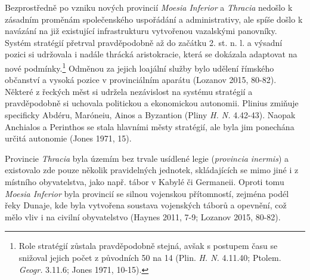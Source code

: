Bezprostředně po vzniku nových provincií {\em Moesia Inferior} a {\em Thracia} nedošlo k zásadním proměnám společenského uspořádání a administrativy, ale spíše došlo k navázání na již existující infrastrukturu vytvořenou vazalskými panovníky. Systém stratégií přetrval pravděpodobně až do začátku 2. st. n. l. a výsadní pozici si udržovala i nadále thrácká aristokracie, která se dokázala adaptovat na nové podmínky.\footnote{Role stratégií zůstala pravděpodobně stejná, avšak s postupem času se snižoval jejich počet z původních 50 na 14 (Plin. {\em H. N.} 4.11.40; Ptolem. {\em Geogr.} 3.11.6; Jones 1971, 10-15).} Odměnou za jejich loajální služby bylo udělení římského občanství a vysoká pozice v provinciálním aparátu (Lozanov 2015, 80-82). Některé z řeckých měst si udržela nezávislost na systému stratégií a pravděpodobně si uchovala politickou a ekonomickou autonomii. Plinius zmiňuje specificky Abdéru, Maróneiu, Ainos a Byzantion (Pliny {\em H. N.} 4.42-43). Naopak Anchialos a Perinthos se stala hlavními městy stratégií, ale byla jim ponechána určitá autonomie (Jones 1971, 15).

Provincie {\em Thracia} byla územím bez trvale usídlené legie ({\em provincia inermis}) a existovalo zde pouze několik pravidelných jednotek, skládajících se mimo jiné i z místního obyvatelstva, jako např. tábor v Kabylé či Germaneii. Oproti tomu {\em Moesia Inferior} byla provincií se silnou vojenskou přítomností, zejména podél řeky Dunaje, kde byla vytvořena soustava vojenských táborů a opevnění, což mělo vliv i na civilní obyvatelstvo (Haynes 2011, 7-9; Lozanov 2015, 80-82).

